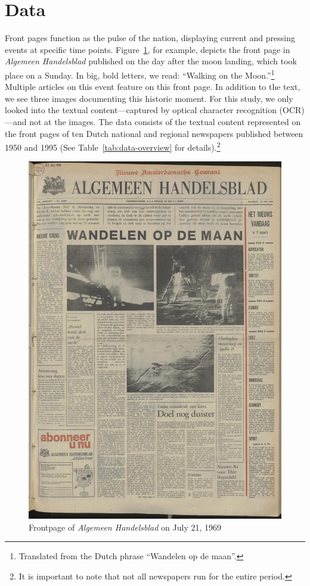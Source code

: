 \documentclass[]{ceurart}
\begin{document}
\section{Data}
Front pages function as the pulse of the nation, displaying current and pressing events at specific time points. Figure~\ref{fig:frontpage_example}, for example, depicts the front page in \textit{Algemeen Handelsblad} published on the day after the moon landing, which took place on a Sunday. In big, bold letters, we read: ``Walking on the Moon.''\footnote{Translated from the Dutch phrase ``Wandelen op de maan''.} Multiple articles on this event feature on this front page. In addition to the text, we see three images documenting this historic moment. For this study, we only looked into the textual content---captured by optical character recognition (OCR)---and not at the images.
The data consists of the textual content represented on the front pages of ten Dutch national and regional newspapers published between 1950 and 1995 (See Table~\ref{tab:data-overview} for details).\footnote{It is important to note that not all newspapers run for the entire period.} 

\begin{figure}
	\centering
		\includegraphics[width=.75\linewidth]{figures/img1.jpg}
		\caption{Frontpage of \textit{Algemeen Handelsblad} on July 21, 1969}
	\label{fig:frontpage_example}
\end{figure}
\end{document}

